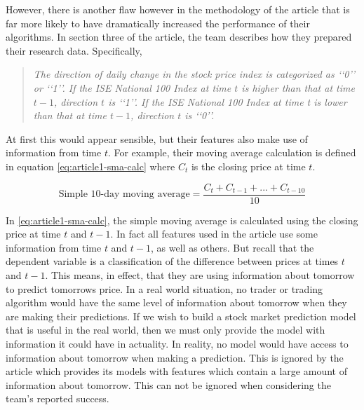 \documentclass{report}
\begin{document}
However, there is another flaw however in the methodology of the article that is far more likely to have dramatically increased the performance of their algorithms. In section three of the article, the team describes how they prepared their research data. Specifically, 

\begin{quotation}
\textit{The direction of daily change in the stock price index is categorized
as ‘‘0’’ or ‘‘1’’. If the ISE National 100 Index at time $t$ is higher
than that at time $t-1$, direction $t$ is ‘‘1’’. If the ISE National 100
Index at time t is lower than that at time $t-1$, direction $t$ is ‘‘0’’.}
\end{quotation}

At first this would appear sensible, but their features also make use of information from time $t$. For example, their moving average calculation is defined in equation \ref{eq:article1-sma-calc} where $C_{t}$ is the closing price at time $t$.

  \begin{figure}[H]
  \begin{center}
      \begin{equation}
        \text{Simple 10-day moving average} = \dfrac
          {C_{t} + C_{t-1} + ... + C_{t-10}} {10}
        \label{eq:article1-sma-calc}
      \end{equation}
  \end{center}
  \end{figure} 

In \ref{eq:article1-sma-calc}, the simple moving average is calculated using the closing price at time $t$ and $t-1$. In fact all features used in the article use some information from time $t$ and $t-1$, as well as others. But recall that the dependent variable is a classification of the difference between prices at times $t$ and $t-1$. This means, in effect, that they are using information about tomorrow to predict tomorrows price. In a real world situation, no trader or trading algorithm would have the same level of information about tomorrow when they are making their predictions. If we wish to build a stock market prediction model that is useful in the real world, then we must only provide the model with information it could have in actuality. In reality, no model would have access to information about tomorrow when making a prediction. This is ignored by the article which provides its models with features which contain a large amount of information about tomorrow. This can not be ignored when considering the team's reported success.
\end{document}
